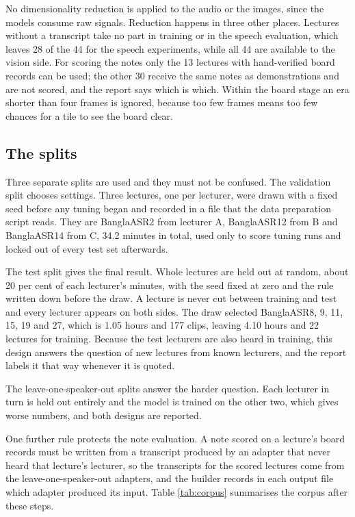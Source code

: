 No dimensionality reduction is applied to the audio or the images, since the models
consume raw signals. Reduction happens in three other places. Lectures without a
transcript take no part in training or in the speech evaluation, which leaves 28 of the 44
for the speech experiments, while all 44 are available to the vision side. For scoring the
notes only the 13 lectures with hand-verified board records can be used; the other 30
receive the same notes as demonstrations and are not scored, and the report says which is
which. Within the board stage an era shorter than four frames is ignored, because too few
frames means too few chances for a tile to see the board clear.

\subsection{The splits}

Three separate splits are used and they must not be confused. The validation split
chooses settings. Three lectures, one per lecturer, were drawn with a
fixed seed before any tuning began and recorded in a file that the data preparation script
reads. They are BanglaASR2 from lecturer A, BanglaASR12 from B and BanglaASR14 from C,
34.2 minutes in total, used only to score tuning runs and locked out of every test set
afterwards.

The test split gives the final result. Whole lectures are held out at random, about 20 per
cent of each lecturer's minutes, with the seed fixed at zero and the rule written down
before the draw. A lecture is never cut between training and test and every lecturer
appears on both sides. The draw selected BanglaASR8, 9, 11, 15, 19 and 27, which is 1.05
hours and 177 clips, leaving 4.10 hours and 22 lectures for training. Because the test
lecturers are also heard in training, this design answers the question of new lectures
from known lecturers, and the report labels it that way whenever it is quoted.

The leave-one-speaker-out splits answer the harder question. Each lecturer in turn is held
out entirely and the model is trained on the other two, which gives worse numbers, and
both designs are reported.

One further rule protects the note evaluation. A note scored on a lecture's board records
must be written from a transcript produced by an adapter that never heard that lecture's
lecturer, so the transcripts for the scored lectures come from the leave-one-speaker-out
adapters, and the builder records in each output file which adapter produced its input.
Table \ref{tab:corpus} summarises the corpus after these steps.

